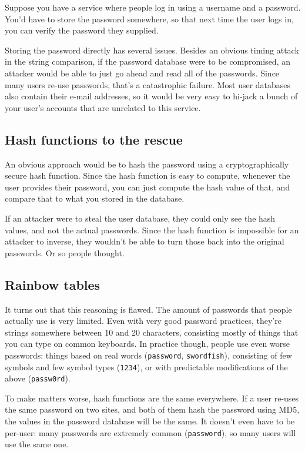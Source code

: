\documentclass[11pt,ebook,table,dvipsnames]{memoir}
\begin{document}
Suppose you have a service where people log in using a username and a
password. You'd have to store the password somewhere, so that next
time the user logs in, you can verify the password they supplied.

Storing the password directly has several issues. Besides an obvious
timing attack in the string comparison, if the password database were
to be compromised, an attacker would be able to just go ahead and read
all of the passwords. Since many users re-use passwords, that's a
catastrophic failure. Most user databases also contain their e-mail
addresses, so it would be very easy to hi-jack a bunch of your user's
accounts that are unrelated to this service.

\subsection{Hash functions to the rescue}
\label{sec-2-6-7-1}

An obvious approach would be to hash the password using a
cryptographically secure hash function. Since the hash function is
easy to compute, whenever the user provides their password, you can
just compute the hash value of that, and compare that to what you
stored in the database.

If an attacker were to steal the user database, they could only see
the hash values, and not the actual passwords. Since the hash function
is impossible for an attacker to inverse, they wouldn't be able to
turn those back into the original passwords. Or so people thought.
\subsection{Rainbow tables}
\label{sec-2-6-7-2}

It turns out that this reasoning is flawed. The amount of passwords
that people actually use is very limited. Even with very good
password practices, they're strings somewhere between 10 and 20
characters, consisting mostly of things that you can type on common
keyboards. In practice though, people use even worse passwords:
things based on real words (\texttt{password}, \texttt{swordfish}), consisting of
few symbols and few symbol types (\texttt{1234}), or with predictable
modifications of the above (\texttt{passw0rd}).

To make matters worse, hash functions are the same everywhere. If a
user re-uses the same password on two sites, and both of them hash the
password using MD5, the values in the password database will be the
same. It doesn't even have to be per-user: many passwords are
extremely common (\texttt{password}), so many users will use the same one.
\end{document}
